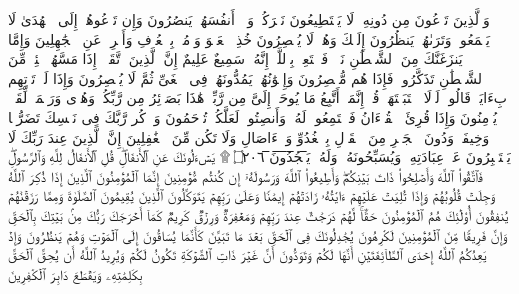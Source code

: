 \startbuffer[\q:7:197]
وَٱلَّذِینَ تَدۡعُونَ مِن دُونِهِۦ لَا یَسۡتَطِیعُونَ نَصۡرَكُمۡ وَلَاۤ أَنفُسَهُمۡ یَنصُرُونَ%
\stopbuffer%
\startbuffer[\q:7:198]
وَإِن تَدۡعُوهُمۡ إِلَى ٱلۡهُدَىٰ لَا یَسۡمَعُوا۟ۖ وَتَرَىٰهُمۡ یَنظُرُونَ إِلَیۡكَ وَهُمۡ لَا یُبۡصِرُونَ%
\stopbuffer%
\startbuffer[\q:7:199]
خُذِ ٱلۡعَفۡوَ وَأۡمُرۡ بِٱلۡعُرۡفِ وَأَعۡرِضۡ عَنِ ٱلۡجَٰهِلِینَ%
\stopbuffer%
\startbuffer[\q:7:200]
وَإِمَّا یَنزَغَنَّكَ مِنَ ٱلشَّیۡطَٰنِ نَزۡغࣱ فَٱسۡتَعِذۡ بِٱللَّهِۚ إِنَّهُۥ سَمِیعٌ عَلِیمٌ%
\stopbuffer%
\startbuffer[\q:7:201]
إِنَّ ٱلَّذِینَ ٱتَّقَوۡا۟ إِذَا مَسَّهُمۡ طَٰۤئِفࣱ مِّنَ ٱلشَّیۡطَٰنِ تَذَكَّرُوا۟ فَإِذَا هُم مُّبۡصِرُونَ%
\stopbuffer%
\startbuffer[\q:7:202]
وَإِخۡوَٰنُهُمۡ یَمُدُّونَهُمۡ فِی ٱلۡغَیِّ ثُمَّ لَا یُقۡصِرُونَ%
\stopbuffer%
\startbuffer[\q:7:203]
وَإِذَا لَمۡ تَأۡتِهِم بِءَایَةࣲ قَالُوا۟ لَوۡلَا ٱجۡتَبَیۡتَهَاۚ قُلۡ إِنَّمَاۤ أَتَّبِعُ مَا یُوحَىٰۤ إِلَیَّ مِن رَّبِّیۚ هَٰذَا بَصَاۤئِرُ مِن رَّبِّكُمۡ وَهُدࣰى وَرَحۡمَةࣱ لِّقَوۡمࣲ یُؤۡمِنُونَ%
\stopbuffer%
\startbuffer[\q:7:204]
وَإِذَا قُرِئَ ٱلۡقُرۡءَانُ فَٱسۡتَمِعُوا۟ لَهُۥ وَأَنصِتُوا۟ لَعَلَّكُمۡ تُرۡحَمُونَ%
\stopbuffer%
\startbuffer[\q:7:205]
وَٱذۡكُر رَّبَّكَ فِی نَفۡسِكَ تَضَرُّعࣰا وَخِیفَةࣰ وَدُونَ ٱلۡجَهۡرِ مِنَ ٱلۡقَوۡلِ بِٱلۡغُدُوِّ وَٱلۡءَاصَالِ وَلَا تَكُن مِّنَ ٱلۡغَٰفِلِینَ%
\stopbuffer%
\startbuffer[\q:7:206]
إِنَّ ٱلَّذِینَ عِندَ رَبِّكَ لَا یَسۡتَكۡبِرُونَ عَنۡ عِبَادَتِهِۦ وَیُسَبِّحُونَهُۥ وَلَهُۥ یَ̅سۡ̅جُ̅دُ̅و̅نَ̅ ۝٢٠٦ ۩%
\stopbuffer%
\startbuffer[\q:8:1]
یَسۡءَلُونَكَ عَنِ ٱلۡأَنفَالِۖ قُلِ ٱلۡأَنفَالُ لِلَّهِ وَٱلرَّسُولِۖ فَٱتَّقُوا۟ ٱللَّهَ وَأَصۡلِحُوا۟ ذَاتَ بَیۡنِكُمۡۖ وَأَطِیعُوا۟ ٱللَّهَ وَرَسُولَهُۥۤ إِن كُنتُم مُّؤۡمِنِینَ%
\stopbuffer%
\startbuffer[\q:8:2]
إِنَّمَا ٱلۡمُؤۡمِنُونَ ٱلَّذِینَ إِذَا ذُكِرَ ٱللَّهُ وَجِلَتۡ قُلُوبُهُمۡ وَإِذَا تُلِیَتۡ عَلَیۡهِمۡ ءَایَٰتُهُۥ زَادَتۡهُمۡ إِیمَٰنࣰا وَعَلَىٰ رَبِّهِمۡ یَتَوَكَّلُونَ%
\stopbuffer%
\startbuffer[\q:8:3]
ٱلَّذِینَ یُقِیمُونَ ٱلصَّلَوٰةَ وَمِمَّا رَزَقۡنَٰهُمۡ یُنفِقُونَ%
\stopbuffer%
\startbuffer[\q:8:4]
أُو۟لَٰۤئِكَ هُمُ ٱلۡمُؤۡمِنُونَ حَقࣰّاۚ لَّهُمۡ دَرَجَٰتٌ عِندَ رَبِّهِمۡ وَمَغۡفِرَةࣱ وَرِزۡقࣱ كَرِیمࣱ%
\stopbuffer%
\startbuffer[\q:8:5]
كَمَاۤ أَخۡرَجَكَ رَبُّكَ مِنۢ بَیۡتِكَ بِٱلۡحَقِّ وَإِنَّ فَرِیقࣰا مِّنَ ٱلۡمُؤۡمِنِینَ لَكَٰرِهُونَ%
\stopbuffer%
\startbuffer[\q:8:6]
یُجَٰدِلُونَكَ فِی ٱلۡحَقِّ بَعۡدَ مَا تَبَیَّنَ كَأَنَّمَا یُسَاقُونَ إِلَى ٱلۡمَوۡتِ وَهُمۡ یَنظُرُونَ%
\stopbuffer%
\startbuffer[\q:8:7]
وَإِذۡ یَعِدُكُمُ ٱللَّهُ إِحۡدَى ٱلطَّاۤئِفَتَیۡنِ أَنَّهَا لَكُمۡ وَتَوَدُّونَ أَنَّ غَیۡرَ ذَاتِ ٱلشَّوۡكَةِ تَكُونُ لَكُمۡ وَیُرِیدُ ٱللَّهُ أَن یُحِقَّ ٱلۡحَقَّ بِكَلِمَٰتِهِۦ وَیَقۡطَعَ دَابِرَ ٱلۡكَٰفِرِینَ%
